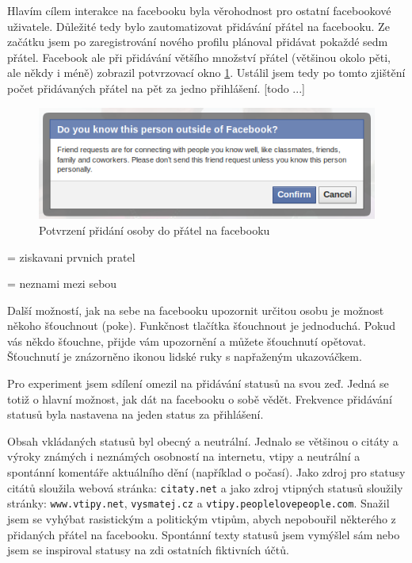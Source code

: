 \documentclass[thesis=M,czech]{FITthesis}[2013/05/10]
\begin{document}
Hlavím cílem interakce na facebooku byla věrohodnost pro ostatní facebookové uživatele. Důležité tedy bylo zautomatizovat přidávání přátel na facebooku. Ze začátku jsem po zaregistrování nového profilu plánoval přidávat pokaždé sedm přátel. Facebook ale při přidávání většího množství přátel (většinou okolo pěti, ale někdy i méně) zobrazil potvrzovací okno \ref{fig:confirmFriendship}. Ustálil jsem tedy po tomto zjištění počet přidávaných přátel na pět za jedno přihlášení. [todo ...]

\begin{figure}[h]
\begin{center}
\includegraphics[width=5in]{figures/confirm-friendship.png}
\caption{Potvrzení přidání osoby do přátel na facebooku}
\label{fig:confirmFriendship}
\end{center}
\end{figure}
= ziskavani prvnich pratel

= neznami mezi sebou


Další možností, jak na sebe na facebooku upozornit určitou osobu je možnost někoho šťouchnout (poke). Funkčnost tlačítka šťouchnout je jednoduchá. Pokud vás někdo šťouchne, přijde vám upozornění a můžete šťouchnutí opětovat. Šťouchnutí je znázorněno ikonou lidské ruky s napřaženým ukazováčkem.

Pro experiment jsem sdílení omezil na přidávání statusů na svou zeď. Jedná se totiž o hlavní možnost, jak dát na facebooku o sobě vědět. Frekvence přidávání statusů byla nastavena na jeden status za přihlášení. 

Obsah vkládaných statusů byl obecný a neutrální. Jednalo se většinou o citáty a výroky známých i neznámých osobností na internetu, vtipy a neutrální a spontánní komentáře aktuálního dění (například o počasí). Jako zdroj pro statusy citátů sloužila webová stránka: \verb|citaty.net| a jako zdroj vtipných statusů sloužily stránky: \verb|www.vtipy.net|, \verb|vysmatej.cz| a \verb|vtipy.peoplelovepeople.com|. Snažil jsem se vyhýbat rasistickým a politickým vtipům, abych nepobouřil některého z přidaných přátel na facebooku. Spontánní texty statusů jsem vymýšlel sám nebo jsem se inspiroval statusy na zdi ostatních fiktivních účtů.
\end{document}
